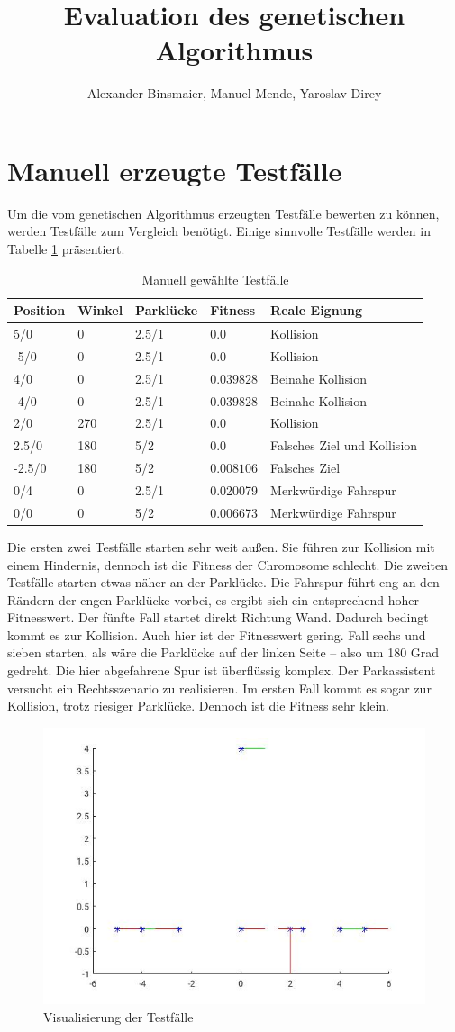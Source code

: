 \documentclass[12pt,a4paper]{article}
\author{Alexander Binsmaier, Manuel Mende, Yaroslav Direy}
\title{Evaluation des genetischen Algorithmus}
\begin{document}
\maketitle
\tableofcontents
\section{Manuell erzeugte Testfälle}
Um die vom genetischen Algorithmus erzeugten Testfälle bewerten zu können, werden Testfälle zum Vergleich benötigt. Einige sinnvolle Testfälle werden in Tabelle \ref{tab:testfaelle} präsentiert.
\begin{table}\centering
\begin{tabular}{l|l|l|l|l}
Position & Winkel & Parklücke & Fitness & Reale Eignung \\\hline
5/0 & 0 & 2.5/1 & $0.0$ & Kollision \\
-5/0 & 0 & 2.5/1 & $0.0$ & Kollision \\
4/0 & 0 & 2.5/1 & $0.039828$ & Beinahe Kollision \\
-4/0 & 0 & 2.5/1 & $0.039828$ & Beinahe Kollision \\
2/0 & 270 & 2.5/1 & $0.0$ & Kollision \\
2.5/0 & 180 & 5/2 & $0.0$ & Falsches Ziel und Kollision \\
-2.5/0 & 180 & 5/2 & $0.008106$ & Falsches Ziel \\
0/4 &  0 & 2.5/1 & 0.020079 & Merkwürdige Fahrspur \\
0/0 &  0 & 5/2 & 0.006673 & Merkwürdige Fahrspur \\
\end{tabular}
\caption{Manuell gewählte Testfälle}
\label{tab:testfaelle}
\end{table}
Die ersten zwei Testfälle starten sehr weit außen. Sie führen zur Kollision mit einem Hindernis, dennoch ist die Fitness der Chromosome schlecht. Die zweiten Testfälle starten etwas näher an der Parklücke. Die Fahrspur führt eng an den Rändern der engen Parklücke vorbei, es ergibt sich ein entsprechend hoher Fitnesswert. Der fünfte Fall startet direkt Richtung Wand. Dadurch bedingt kommt es zur Kollision. Auch hier ist der Fitnesswert gering. Fall sechs und sieben starten, als wäre die Parklücke auf der linken Seite -- also um 180 Grad gedreht. Die hier abgefahrene Spur ist überflüssig komplex. Der Parkassistent versucht ein Rechtsszenario zu realisieren. Im ersten Fall kommt es sogar zur Kollision, trotz riesiger Parklücke. Dennoch ist die Fitness sehr klein.
\begin{figure}\centering
\includegraphics[width=.6\textwidth]{myTestcases.jpg}
\caption{Visualisierung der Testfälle}
\label{fig:testcases}
\end{figure}
\end{document}
